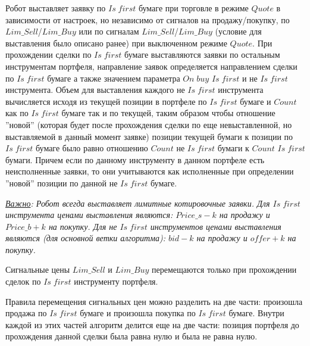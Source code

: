 Робот выставляет заявку по $Is \; first$ бумаге при торговле в режиме $Quote$ в зависимости от настроек, но независимо от сигналов на продажу/покупку, по $Lim\_Sell$/$Lim\_Buy$
или по сигналам $Lim\_Sell$/$Lim\_Buy$ (условие для выставления было описано ранее) при выключенном режиме $Quote$. При прохождении сделки по $Is \; first$ бумаге выставляются
заявки по остальным инструментам портфеля, направление заявок определяется направлением сделки по $Is \; first$ бумаге а также значением параметра $On \; buy$ $Is \; first$ и не
$Is \; first$ инструмента. Объем для выставления каждого не $Is \; first$ инструмента вычисляется исходя из текущей позиции в портфеле по $Is \; first$ бумаге и $Count$
как по $Is \; first$ бумаге так и по текущей, таким образом чтобы отношение ''новой'' (которая будет после прохождения сделки по еще невыставленной, но выставляемой в
данный момент заявке) позиции текущей бумаги к позиции по $Is \; first$ бумаге было равно отношению $Count$ не $Is \; first$ бумаги к $Count$ $Is \; first$ бумаги. Причем если
по данному инструменту в данном портфеле есть неисполненные заявки, то они учитываются как исполненные при определении ''новой'' позиции по данной не $Is \; first$ бумаге.

\vspace{4mm}
\noindent\textit{\underline{Важно}: Робот всегда выставляет лимитные котировочные заявки. Для $Is \; first$ инструмента ценами выставления являются: 
$Price\_s - k$ на продажу и $Price\_b + k$ на покупку. Для не $Is \; first$ инструментов ценами выставления являются (для основной ветки алгоритма):
$bid - k$ на продажу и $offer + k$ на покупку.}

Сигнальные цены $Lim\_Sell$ и $Lim\_Buy$ перемещаются только при прохождении сделок по $Is \; first$ инструменту портфеля.

Правила перемещения сигнальных цен можно разделить на две части: произошла продажа по $Is \; first$ бумаге и произошла покупка по $Is \; first$ бумаге. Внутри каждой из этих
частей алгоритм делится еще на две части: позиция портфеля до прохождения данной сделки была равна нулю и была не равна нулю.

